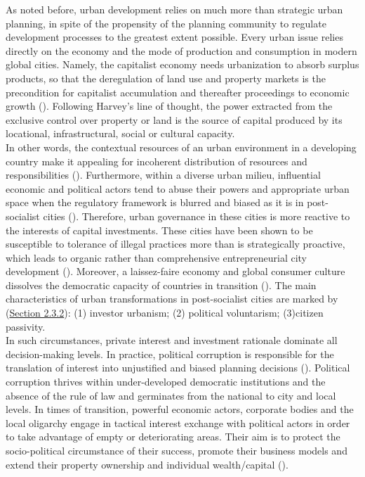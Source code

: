 \documentclass[11pt]{report}
\begin{document}
{{{{As noted before, urban development relies on much more than strategic urban planning, in spite of the propensity of the planning community to regulate development processes to the greatest extent possible. Every urban issue relies directly on the economy and the mode of production and consumption in modern global cities. Namely, the capitalist economy needs urbanization to absorb surplus products, so that the deregulation of land use and property markets is the precondition for capitalist accumulation and thereafter proceedings to economic growth (\href{Harvey}{\citealt{harvey_rebel_2012}}). Following Harvey’s line of thought, the power extracted from the exclusive control over property or land is the source of capital produced by its locational, infrastructural, social or cultural capacity.
\\
In other words, the contextual resources of an urban environment in a developing country make it appealing for incoherent distribution of resources and responsibilities (\href{Bolay}{\citealt{bolay_urban_2005}}). Furthermore, within a diverse urban milieu, influential economic and political actors tend to abuse their powers and appropriate urban space when the regulatory framework is blurred and biased as it is in post-socialist cities (\href{Djokic}{\citealt{djokic_political_2007}}). 
Therefore, urban governance in these cities is more reactive to the interests of capital investments. These cities have been shown to be susceptible to tolerance of illegal practices more than is strategically proactive, which leads to organic rather than comprehensive entrepreneurial city development (\href{Petrovic}{\citealt{petrovic_cities_2009}}).
Moreover, a laissez-faire economy and global consumer culture  dissolves the democratic capacity of countries in transition (\href{Ellin}{\citealt{ellin_postmodern_1999}}). The main characteristics of urban transformations in post-socialist cities are marked by (\href{Section 2.3.2}{Section 2.3.2}):
(1) investor urbanism;
(2) political voluntarism;
(3)citizen passivity.
\\

In such circumstances, private interest and investment rationale dominate all decision-making levels. In practice, political corruption is responsible for the translation of interest into unjustified and biased planning decisions 
(\href{Nedovic}{\citealt{nedovic-budic_adjustment_2001}}).
Political corruption thrives within under-developed democratic institutions and the absence of the rule of law and germinates from the national to city and local levels. In times of transition, powerful economic actors, corporate bodies and the local oligarchy engage in tactical interest exchange with political actors in order to take advantage of empty or deteriorating areas. Their aim is to protect the socio-political circumstance of their success, promote their business models and extend their property ownership and individual wealth/capital (\href{Lazarevic}{\citealt{bajec_rational_2009}}).
\\

}}}}
\end{document}
